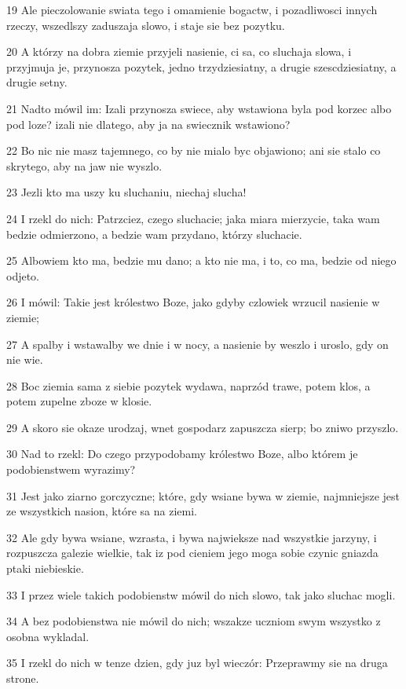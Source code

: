 \par 19 Ale pieczolowanie swiata tego i omamienie bogactw, i pozadliwosci innych rzeczy, wszedlszy zaduszaja slowo, i staje sie bez pozytku.
\par 20 A którzy na dobra ziemie przyjeli nasienie, ci sa, co sluchaja slowa, i przyjmuja je, przynosza pozytek, jedno trzydziesiatny, a drugie szescdziesiatny, a drugie setny.
\par 21 Nadto mówil im: Izali przynosza swiece, aby wstawiona byla pod korzec albo pod loze? izali nie dlatego, aby ja na swiecznik wstawiono?
\par 22 Bo nic nie masz tajemnego, co by nie mialo byc objawiono; ani sie stalo co skrytego, aby na jaw nie wyszlo.
\par 23 Jezli kto ma uszy ku sluchaniu, niechaj slucha!
\par 24 I rzekl do nich: Patrzciez, czego sluchacie; jaka miara mierzycie, taka wam bedzie odmierzono, a bedzie wam przydano, którzy sluchacie.
\par 25 Albowiem kto ma, bedzie mu dano; a kto nie ma, i to, co ma, bedzie od niego odjeto.
\par 26 I mówil: Takie jest królestwo Boze, jako gdyby czlowiek wrzucil nasienie w ziemie;
\par 27 A spalby i wstawalby we dnie i w nocy, a nasienie by weszlo i uroslo, gdy on nie wie.
\par 28 Boc ziemia sama z siebie pozytek wydawa, naprzód trawe, potem klos, a potem zupelne zboze w klosie.
\par 29 A skoro sie okaze urodzaj, wnet gospodarz zapuszcza sierp; bo zniwo przyszlo.
\par 30 Nad to rzekl: Do czego przypodobamy królestwo Boze, albo którem je podobienstwem wyrazimy?
\par 31 Jest jako ziarno gorczyczne; które, gdy wsiane bywa w ziemie, najmniejsze jest ze wszystkich nasion, które sa na ziemi.
\par 32 Ale gdy bywa wsiane, wzrasta, i bywa najwieksze nad wszystkie jarzyny, i rozpuszcza galezie wielkie, tak iz pod cieniem jego moga sobie czynic gniazda ptaki niebieskie.
\par 33 I przez wiele takich podobienstw mówil do nich slowo, tak jako sluchac mogli.
\par 34 A bez podobienstwa nie mówil do nich; wszakze uczniom swym wszystko z osobna wykladal.
\par 35 I rzekl do nich w tenze dzien, gdy juz byl wieczór: Przeprawmy sie na druga strone.
